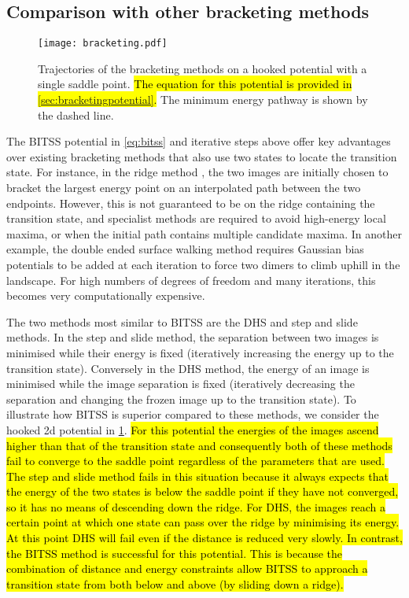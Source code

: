 \documentclass[aip,jcp,reprint,twocolumn]{revtex4-1}
\begin{document}
\subsection{Comparison with other bracketing methods}
\begin{figure}[htb]
  \texttt{[image: bracketing.pdf]}
  \caption{\label{fig:bracketing}
    Trajectories of the bracketing methods on a hooked potential with a single saddle point.
    \hl{The equation for this potential is provided in \mbox{\cref{sec:bracketingpotential}}.}
    The minimum energy pathway is shown by the dashed line.
  }
\end{figure}
The BITSS potential in \cref{eq:bitss} and iterative steps above offer key advantages over existing bracketing methods that also use two states to locate the transition state.
For instance, in the ridge method \cite{Ionova1993}, the two images are initially chosen to bracket the largest energy point on an interpolated path between the two endpoints.
However, this is not guaranteed to be on the ridge containing the transition state, and specialist methods are required to avoid high-energy local maxima, or when the initial path contains multiple candidate maxima.
In another example, the double ended surface walking method \cite{Zhang2013} requires Gaussian bias potentials to be added at each iteration to force two dimers to climb uphill in the landscape.
For high numbers of degrees of freedom and many iterations, this becomes very computationally expensive.

The two methods most similar to BITSS are the DHS \cite{Dewar1984} and step and slide \cite{Miron2001} methods.
In the step and slide method, the separation between two images is minimised while their energy is fixed (iteratively increasing the energy up to the transition state).
Conversely in the DHS method, the energy of an image is minimised while the image separation is fixed (iteratively decreasing the separation and changing the frozen image up to the transition state).
To illustrate how BITSS is superior compared to these methods, we consider the hooked 2d potential in \cref{fig:bracketing}.
\hl{For this potential the energies of the images ascend higher than that of the transition state and consequently both of these methods fail to converge to the saddle point regardless of the parameters that are used.
The step and slide method fails in this situation because it always expects that the energy of the two states is below the saddle point if they have not converged, so it has no means of descending down the ridge.
For DHS, the images reach a certain point at which one state can pass over the ridge by minimising its energy.
At this point DHS will fail even if the distance is reduced very slowly.
In contrast, the BITSS method is successful for this potential.
This is because the combination of distance and energy constraints allow BITSS to approach a transition state from both below and above (by sliding down a ridge).}
\end{document}

